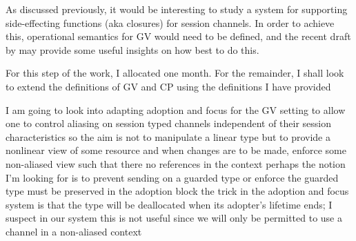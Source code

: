 \documentclass{mprop}
\newcommand{\1}{\textbf{1}\xspace}
\begin{document}
As discussed previously, it would be
interesting to study a system for supporting side-effecting functions (aka
closures) for session channels. In order to achieve this, operational
semantics for GV would need to be defined, and the recent draft by
\citeauthor{Lindley:2014:SPS} may provide some useful insights on how best to
do this. 

For this step of the work, I allocated one month. For the remainder, I shall
look to extend the definitions of GV and CP using the definitions I have
provided

I am going to look into adapting adoption and focus for the GV setting to
allow one to control aliasing on session typed channels independent of their
session characteristics so the aim is not to manipulate a linear type but to
provide a nonlinear view of some resource and when changes are to be made,
enforce some non-aliased view such that there no references in the context
perhaps the notion I'm looking for is to prevent sending on a guarded type or
enforce the guarded type must be preserved in the adoption block the trick in
the adoption and focus system is that the type will be deallocated when its
adopter's lifetime ends; I suspect in our system this is not useful since we
will only be permitted to use a channel in a non-aliased context


\printbibliography
\end{document}
